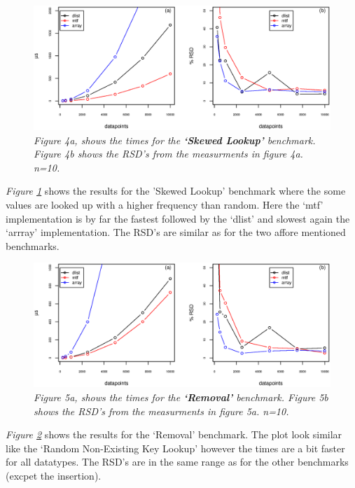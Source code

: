 \documentclass[a4paper,11pt,twoside]{article}
\begin{document}
\begin{figure}[H] 
\centering 
\includegraphics[width=\textwidth]{figures/fig4.eps}
\caption{\textit{Figure 4a, shows the times for the \textbf{`Skewed
      Lookup'} benchmark. Figure 4b shows the RSD's from the
    measurments in figure 4a. n=10.}}
\label{fig:skewed}
\end{figure}

\textit{Figure \ref{fig:skewed}} shows the results for the 'Skewed
Lookup' benchmark where the some values are looked up with a higher
frequency than random. Here the `mtf' implementation is by far the
fastest followed by the `dlist' and slowest again the `arrray'
implementation. The RSD's are similar as for the two affore mentioned
benchmarks.


\begin{figure}[H] 
\centering 
\includegraphics[width=\textwidth]{figures/fig5.eps}
\caption{\textit{Figure 5a, shows the times for the \textbf{`Removal'}
    benchmark. Figure 5b shows the RSD's from the measurments in figure 5a. n=10.}}
\label{fig:remove}
\end{figure}

\textit{Figure \ref{fig:remove}} shows the results for the `Removal'
benchmark. The plot look similar like the `Random Non-Existing Key
Lookup' however the times are a bit faster for all datatypes. The
RSD's are in the same range as for the other benchmarks (excpet the
insertion). 
\end{document}
